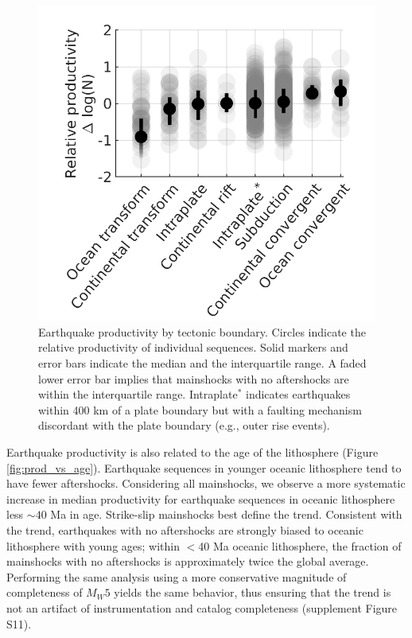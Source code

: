 \documentclass[draft, jgrga]{agujournal2018}
\begin{document}
    \begin{figure}
        \centering
        \includegraphics{figures/prod_by_pb.png}
        \caption{Earthquake productivity by tectonic boundary. Circles indicate the relative productivity of individual sequences. Solid markers and error bars indicate the median and the interquartile range. A faded lower error bar implies that mainshocks with no aftershocks are within the interquartile range. Intraplate$^*$ indicates earthquakes within 400 km of a plate boundary but with a faulting mechanism discordant with the plate boundary (e.g., outer rise events).}
        \label{fig:plate_boundary}
    \end{figure}
    
    Earthquake productivity is also related to the age of the lithosphere  (Figure \ref{fig:prod_vs_age}). Earthquake sequences in younger oceanic lithosphere tend to have fewer aftershocks. Considering all mainshocks, we observe a more systematic increase in median productivity for earthquake sequences in oceanic lithosphere less $\sim 40$ Ma in age. Strike-slip mainshocks best define the trend. Consistent with the trend, earthquakes with no aftershocks are strongly biased to oceanic lithosphere with young ages; within $<$40 Ma oceanic lithosphere, the fraction of mainshocks with no aftershocks is approximately twice the global average. Performing the same analysis using a more conservative magnitude of completeness of $M_W5$ yields the same behavior, thus ensuring that the trend is not an artifact of instrumentation and catalog completeness (supplement Figure S11).
    
\end{document}
